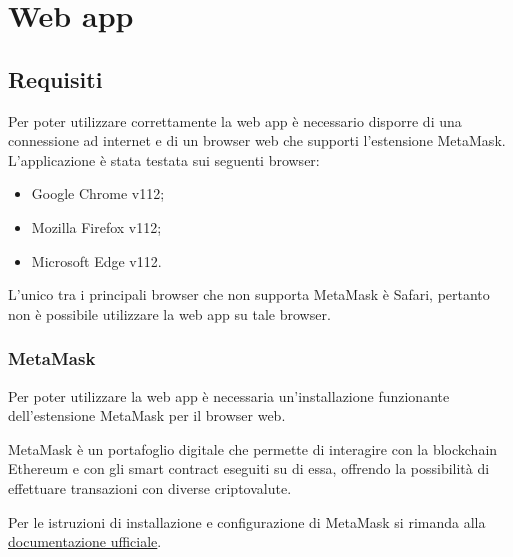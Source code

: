 \section{Web app}

\subsection{Requisiti}
Per poter utilizzare correttamente la web app è necessario disporre di una connessione ad internet e di un browser web che supporti l'estensione MetaMask. L'applicazione è stata testata sui seguenti browser:
\begin{itemize}
    \item Google Chrome v112;
    \item Mozilla Firefox v112;
    \item Microsoft Edge v112.
\end{itemize}
L'unico tra i principali browser che non supporta MetaMask è Safari, pertanto non è possibile utilizzare la web app su tale browser.

\subsubsection{MetaMask}
Per poter utilizzare la web app è necessaria un'installazione funzionante dell'estensione MetaMask per il browser web.

MetaMask è un portafoglio digitale che permette di interagire con la blockchain Ethereum e con gli smart contract eseguiti su di essa, offrendo la possibilità di effettuare transazioni con diverse criptovalute.

Per le istruzioni di installazione e configurazione di MetaMask si rimanda alla \href{https://support.metamask.io/hc/en-us/articles/360015489531-Getting-started-with-MetaMask}{documentazione ufficiale}.
\pagebreak

